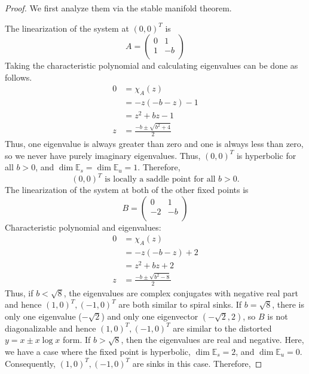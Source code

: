 \documentclass[../psets.tex]{subfiles}
\begin{document}
\begin{enumerate}
\begin{enumerate}
\begin{proof}
            We first analyze them via the stable manifold theorem.\par
            The linearization of the system at $(0,0)^T$ is
            \begin{equation*}
                A =
                \begin{pmatrix}
                    0 & 1\\
                    1 & -b\\
                \end{pmatrix}
            \end{equation*}
            Taking the characteristic polynomial and calculating eigenvalues can be done as follows.
            \begin{align*}
                0 &= \chi_A(z)\\
                &= -z(-b-z)-1\\
                &= z^2+bz-1\\
                z &= \frac{-b\pm\sqrt{b^2+4}}{2}
            \end{align*}
            Thus, one eigenvalue is always greater than zero and one is always less than zero, so we never have purely imaginary eigenvalues. Thus, $(0,0)^T$ is hyperbolic for all $b>0$, and $\dim\mathbb{E}_s=\dim\mathbb{E}_u=1$. Therefore,
            \begin{equation*}
                \boxed{(0,0)^T\text{ is locally a saddle point for all }b>0.}
            \end{equation*}
            The linearization of the system at both of the other fixed points is
            \begin{equation*}
                B =
                \begin{pmatrix}
                    0 & 1\\
                    -2 & -b\\
                \end{pmatrix}
            \end{equation*}
            Characteristic polynomial and eigenvalues:
            \begin{align*}
                0 &= \chi_A(z)\\
                &= -z(-b-z)+2\\
                &= z^2+bz+2\\
                z &= \frac{-b\pm\sqrt{b^2-8}}{2}
            \end{align*}
            Thus, if $b<\sqrt{8}$, the eigenvalues are complex conjugates with negative real part and hence $(1,0)^T,(-1,0)^T$ are both similar to spiral sinks. If $b=\sqrt{8}$, there is only one eigenvalue ($-\sqrt{2}$) and only one eigenvector $(-\sqrt{2},2)$, so $B$ is not diagonalizable and hence $(1,0)^T,(-1,0)^T$ are similar to the distorted $y=x\pm x\log x$ form. If $b>\sqrt{8}$, then the eigenvalues are real and negative. Here, we have a case where the fixed point is hyperbolic, $\dim\mathbb{E}_s=2$, and $\dim\mathbb{E}_u=0$. Consequently, $(1,0)^T,(-1,0)^T$ are sinks in this case. Therefore,

\end{proof}
\end{enumerate}
\end{enumerate}
\end{document}
